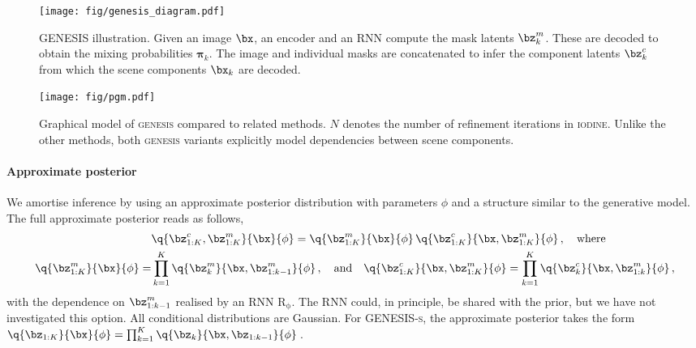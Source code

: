 \documentclass{article}
\begin{document}
\begin{figure}[t!]
    \centering
    \texttt{[image: fig/genesis\_diagram.pdf]}
    \caption{\gls{GENESIS} illustration. Given an image $\bx$, an encoder and an \gls{RNN} compute the mask latents $\bz^m_k$. These are decoded to obtain the mixing probabilities $\mathbf{\pi}_k$. The image and individual masks are concatenated to infer the component latents $\bz^c_k$ from which the scene components $\bx_k$ are decoded.
    }
    \label{fig:arch}
\end{figure}

\begin{figure}
	\centering
	\texttt{[image: fig/pgm.pdf]}
    \caption{Graphical model of \textsc{genesis} compared to related methods. $N$ denotes the number of refinement iterations in \textsc{iodine}. Unlike the other methods, both \textsc{genesis} variants explicitly model dependencies between scene components.}
\label{fig:pgms}
\end{figure}

\paragraph{Approximate posterior}
We amortise inference by using an approximate posterior distribution with parameters $\phi$ and a structure similar to the generative model. 
The full approximate posterior reads as follows,
\begin{equation}
	\begin{aligned}
	&\q{\bz_{1:K}^c, \bz_{1:K}^m}{\bx}{\phi} = \q{\bz_{1:K}^m}{\bx}{\phi}\, \q{\bz_{1:K}^c}{\bx, \bz_{1:K}^m}{\phi}\,,\quad \text{where}\\
	\q{\bz_{1:K}^m}{\bx}{\phi} = &\prod_{k=1}^K \q{\bz_k^m}{\bx, \bz_{1:k-1}^m}{\phi}\,,
	\quad \text{and} \quad
	\q{\bz_{1:K}^c}{\bx, \bz_{1:K}^m}{\phi} = \prod_{k=1}^K \q{\bz_k^c}{\bx, \bz_{1:k}^m}{\phi}\,,
	\end{aligned}
\end{equation}
with the dependence on $\bz^m_{1:k-1}$ realised by an \gls{RNN} $\operatorname{R_\phi}$. The \gls{RNN} could, in principle, be shared with the prior, but we have not investigated this option. All conditional distributions are Gaussian.
For \gls{GENESIS}\textsc{-s}, the approximate posterior takes the form $\q{\bz_{1:K}}{\bx}{\phi} = \prod_{k=1}^K \q{\bz_k}{\bx, \bz_{1:k-1}}{\phi}$\,.
\end{document}
